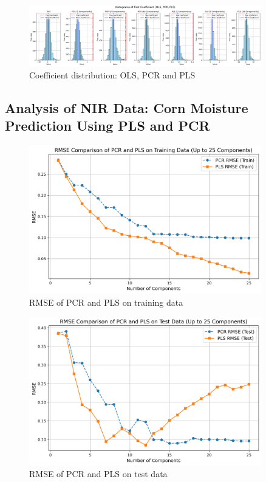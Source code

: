 \documentclass[11pt,twoside,a4paper]{article}
\begin{document}
\begin{figure}[H]
    \centering
    \includegraphics[width=0.9\textwidth]{Fourth_plot_third_simulation.png}
    \caption{Coefficient distribution: OLS, PCR and PLS}
    \label{fig:Severe_multicollinear_data_analysis}
\end{figure}

\subsection{Analysis of NIR Data: Corn Moisture Prediction Using PLS and PCR}

\begin{figure}[H]
    \centering
    \includegraphics[width=0.9\textwidth]{NIR_second_plot.png}
    \caption{RMSE of PCR and PLS on training data}
    \label{fig:NIR_analysis}
\end{figure}

\begin{figure}[H]
    \centering
    \includegraphics[width=0.9\textwidth]{NIR_third_plot.png}
    \caption{RMSE of PCR and PLS on test data}
    \label{fig:NIR_analysis}
\end{figure}
\end{document}
